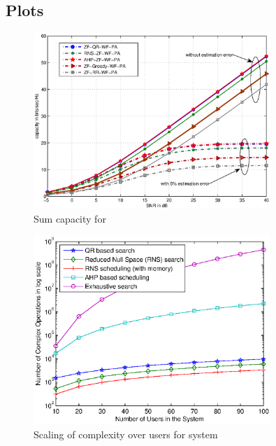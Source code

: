 \documentclass{beamer}
\begin{document}
\subsection{Plots}

\begin{frame}
\begin{figure}
\centering
\includegraphics[width=0.8\textwidth]{single-bs-1}
\caption[short]{Sum capacity for }
\label{single-bs-f1}
\end{figure}
\end{frame}

\begin{frame}
\begin{figure}
\centering
\includegraphics[width=0.8\textwidth]{single-bs-2}
\caption[short]{Scaling of complexity over users for  system}
\label{single-bs-f2}
\end{figure}
\end{frame}
\end{document}
